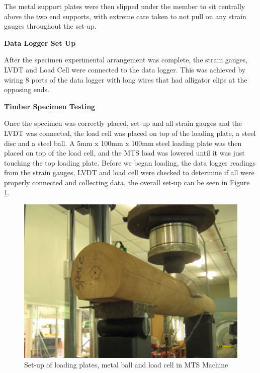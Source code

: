 \documentclass[11pt,a4paper]{article}
\numberwithin{equation}{subsection}
\begin{document}
\noindent
The metal support plates were then slipped under the member to sit centrally above the two end supports, with extreme care taken to not pull on any strain gauges throughout the set-up. 

\vspace*{\baselineskip}

\noindent
\textbf{Data Logger Set Up}\par
\noindent
After the specimen experimental arrangement was complete, the strain gauges, LVDT and Load Cell were connected to the data logger. This was achieved by wiring 8 ports of the data logger with long wires that had alligator clips at the opposing ends.

\vspace*{\baselineskip}

\noindent
\textbf{Timber Specimen Testing}\par
\noindent
Once the specimen was correctly placed, set-up and all strain gauges and the LVDT was connected, the load cell was placed on top of the loading plate, a steel disc and a steel ball. A 5mm x 100mm x 100mm steel loading plate was then placed on top of the load cell, and the MTS load was lowered until it was just touching the top loading plate. Before we began loading, the data logger readings from the strain gauges, LVDT and load cell were checked to determine if all were properly connected and collecting data, the overall set-up can be seen in Figure \ref{fig:SETUP}.

\begin{figure}[h]
	\begin{center}
		\includegraphics[scale=0.35]{SETUP}
	\end{center}
	\caption{Set-up of loading plates, metal ball and load cell in MTS Machine}
	\label{fig:SETUP}
\end{figure}
\pagebreak
\end{document}
